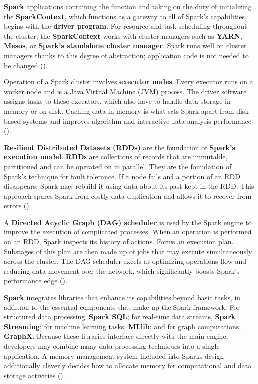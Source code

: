 \textbf{Spark} applications containing the function and taking on the duty of initializing the \textbf{SparkContext}, which functions as a gateway to all of Spark's capabilities, begins with the \textbf{driver program}. For resource and task scheduling throughout the cluster, the \textbf{SparkContext} works with cluster managers such as \textbf{YARN}, \textbf{Mesos}, or \textbf{Spark's standalone cluster manager}. Spark runs well on cluster managers thanks to this degree of abstraction; application code is not needed to be changed (\cite{Kona2023LeveragingSA})\footnotemark[16].

Operation of a Spark cluster involves \textbf{executor nodes}. Every executor runs on a worker node and is a Java Virtual Machine (JVM) process. The driver software assigns tasks to these executors, which also have to handle data storage in memory or on disk. Caching data in memory is what sets Spark apart from disk-based systems and improves algorithm and interactive data analysis performance (\cite{Kona2023LeveragingSA})\footnotemark[16].


\textbf{Resilient Distributed Datasets (RDDs)} are the foundation of \textbf{Spark's execution model}. \textbf{RDDs} are collections of records that are immutable, partitioned and can be operated on in parallel. They are the foundation of Spark's technique for fault tolerance. If a node fails and a portion of an RDD disappears, Spark may rebuild it using data about its past kept in the RDD. This approach spares Spark from costly data duplication and allows it to recover from errors (\cite{Kona2023LeveragingSA})\footnotemark[16]. 

A \textbf{Directed Acyclic Graph (DAG) scheduler} is used by the Spark engine to improve the execution of complicated processes. When an operation is performed on an RDD, Spark inspects its history of actions. Forms an execution plan. Substages of this plan are then made up of jobs that may execute simultaneously across the cluster. The DAG scheduler excels at optimizing operations flow and reducing data movement over the network, which significantly boosts Spark's performance edge (\cite{Kona2023LeveragingSA})\footnotemark[16]. 

\textbf{Spark} integrates libraries that enhance its capabilities beyond basic tasks, in addition to the essential components that make up the Spark framework. For structured data processing, \textbf{Spark SQL}; for real-time data streams, \textbf{Spark Streaming}; for machine learning tasks, \textbf{MLlib}; and for graph computations, \textbf{GraphX}. Because these libraries interface directly with the main engine, developers may combine many data processing techniques into a single application. A memory management system included into Sparks design additionally cleverly decides how to allocate memory for computational and data storage activities (\cite{Kona2023LeveragingSA})\footnotemark[16].

